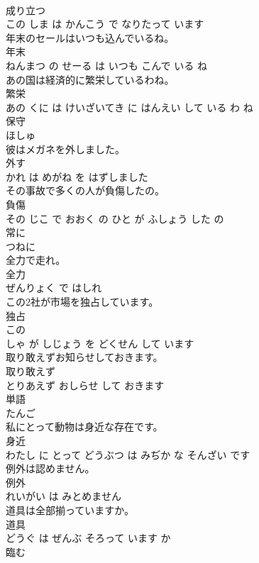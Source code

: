 \documentclass[8pt]{extreport}
\begin{document}
\begin{CJK}{UTF8}{min}
\\	成り立つ 
\\	この しま は かんこう で なりたって います			
\\	年末のセールはいつも込んでいるね。	
\\	年末 
\\	ねんまつ の せーる は いつも こんで いる ね			
\\	あの国は経済的に繁栄しているわね。	
\\	繁栄 
\\	あの くに は けいざいてき に はんえい して いる わ ね			
\\	保守	
\\	ほしゅ		
\\	彼はメガネを外しました。	
\\	外す 
\\	かれ は めがね を はずしました			
\\	その事故で多くの人が負傷したの。	
\\	負傷 
\\	その じこ で おおく の ひと が ふしょう した の			
\\	常に	
\\	つねに		
\\	全力で走れ。	
\\	全力 
\\	ぜんりょく で はしれ			
\\	この2社が市場を独占しています。	
\\	独占 
\\	この 
\\	しゃ が しじょう を どくせん して います			
\\	取り敢えずお知らせしておきます。	
\\	取り敢えず 
\\	とりあえず おしらせ して おきます			
\\	単語	
\\	たんご		
\\	私にとって動物は身近な存在です。	
\\	身近 
\\	わたし に とって どうぶつ は みぢか な そんざい です			
\\	例外は認めません。	
\\	例外 
\\	れいがい は みとめません			
\\	道具は全部揃っていますか。	
\\	道具 
\\	どうぐ は ぜんぶ そろって います か			
\\	臨む	

\end{CJK}
\end{document}
